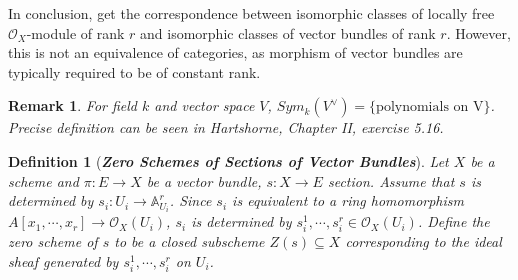 \documentclass{ctexart}
\newtheorem{definition}{Definition}[section]
\newtheorem{remark}{Remark}[section]
\begin{document}
In conclusion, get the correspondence between isomorphic classes of locally free $\mathcal{O}_{X}$-module of rank $r$ and isomorphic classes of vector bundles of rank $r$.
However, this is not an equivalence of categories, as morphism of vector bundles are typically required to be of constant rank.
\begin{remark}
    For field $k$ and vector space $V$, $Sym_{k}(V^{\lor}) = \{\text{polynomials on V}\}$.
    Precise definition can be seen in Hartshorne, Chapter II, exercise 5.16.
\end{remark}
\begin{definition}[\textbf{\emph{Zero Schemes of Sections of Vector Bundles}}]
    Let $X$ be a scheme and $\pi: E \longrightarrow X$ be a vector bundle, $s: X \longrightarrow E$ section.
    Assume that $s$ is determined by $s_{i}: U_{i} \longrightarrow \mathbb{A}_{U_{i}}^{r}$.
    Since $s_{i}$ is equivalent to a ring homomorphism $A[x_{1}, \cdots, x_{r}] \longrightarrow \mathcal{O}_{X}(U_{i})$, $s_{i}$ is determined by $s_{i}^{1}, \cdots, s_{i}^{r}\in \mathcal{O}_{X}(U_{i})$.
    Define the zero scheme of $s$ to be a closed subscheme $Z(s) \subseteq X$ corresponding to the ideal sheaf generated by $s_{i}^{1}, \cdots, s_{i}^{r}$ on $U_{i}$.
\end{definition}
\end{document}
